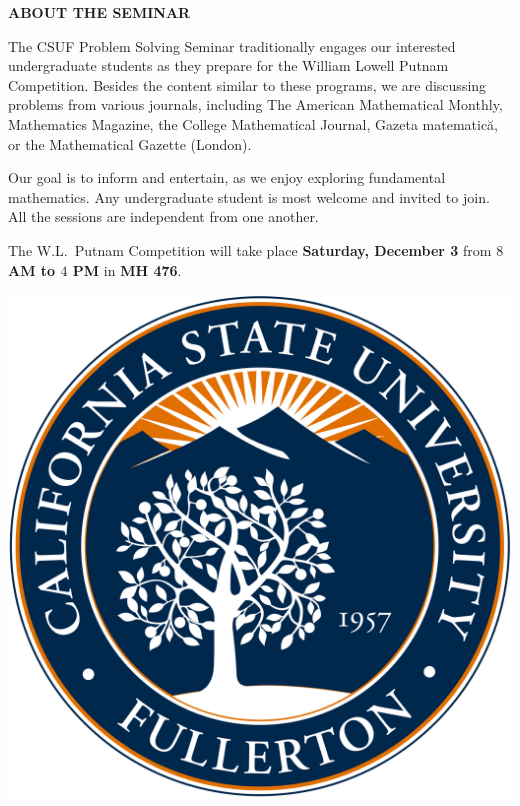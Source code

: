 \documentclass[a4paper]{article}
\begin{document}
\begin{minipage}{0.95\textwidth}
\begin{minipage}[b]{0.47\textwidth}
{\large\raggedright
{\textbf{\color{csecondary}ABOUT THE SEMINAR}}\par
}
\normalsize
\smallskip

The CSUF Problem Solving Seminar traditionally engages our interested undergraduate students as they prepare for
the William Lowell Putnam Competition. Besides the content similar to these programs, we are discussing problems
from various journals, including The American Mathematical Monthly, Mathematics Magazine, the College
Mathematical Journal, Gazeta matematică, or the Mathematical Gazette (London).

\medskip

Our goal is to inform and entertain, as we enjoy exploring fundamental mathematics. Any undergraduate student is
most welcome and invited to join. All the sessions are independent from one another.

\medskip

The W.L.~Putnam Competition will take place \textbf{Saturday, December 3} from \textbf{$8$ AM to $4$ PM} in \textbf{MH 476}.
\begin{center}
\includegraphics[width=0.55\linewidth]{csuf_seal.png}
\end{center}
\smallskip


\end{minipage}
\end{minipage}
\end{document}

